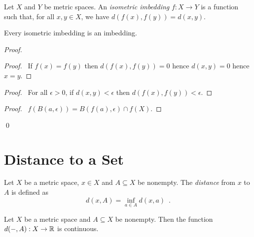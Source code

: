 \begin{definition}
    Let $X$ and $Y$ be metric spaces. An \emph{isometric imbedding} $f : X \rightarrow Y$ is a function such that, for all $x, y \in X$, we have $d(f(x),f(y)) = d(x,y)$.
\end{definition}

\begin{proposition}
    \label{proposition:isometric_imbedding}
    Every isometric imbedding is an imbedding.
\end{proposition}

\begin{proof}
    \pf
    \begin{proof}
        \pf\ If $f(x) = f(y)$ then $d(f(x),f(y)) = 0$ hence $d(x,y) = 0$ hence $x = y$.
    \end{proof}
    \begin{proof}
        \pf\ For all $\epsilon > 0$, if $d(x,y) < \epsilon$ then $d(f(x),f(y)) < \epsilon$.
    \end{proof}
    \begin{proof}
        \pf\ $f(B(a,\epsilon)) = B(f(a),\epsilon) \cap f(X)$.
    \end{proof}
    \qed
\end{proof}

\section{Distance to a Set}

\begin{definition}
    Let $X$ be a metric space, $x \in X$ and $A \subseteq X$ be nonempty. The \emph{distance} from $x$ to $A$ is defined as
    \[ d(x,A) = \inf_{a \in A} d(x,a) \enspace . \]
\end{definition}

\begin{proposition}
    \label{proposition:distance_continuous}
    Let $X$ be a metric space and $A \subseteq X$ be nonempty. Then the function
    $d(-,A) : X \rightarrow \mathbb{R}$ is continuous.
\end{proposition}

